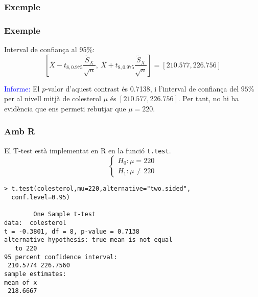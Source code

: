 \documentclass[12pt,t]{beamer}\usepackage[]{graphicx}\usepackage[]{color}
\newcommand{\red}[1]{\textcolor{red}{#1}}
\newcommand{\blue}[1]{\textcolor{blue}{#1}}
\renewcommand{\emph}[1]{{\color{red}#1}}
\renewcommand{\leq}{\leqslant}
\renewcommand{\geq}{\geqslant}
\theoremstyle{plain}
\theoremstyle{definition}
\begin{document}
\begin{frame}
\frametitle{Exemple}



\end{frame}

\begin{frame}
\frametitle{Exemple}

\emph{Interval de confiança al 95\%}:\pause
$$
\left[\overline{X}-t_{8,0.975}\frac{\widetilde{S}_X}{\sqrt{n}},\ \overline{X}+t_{8,0.975}\frac{\widetilde{S}_X}{\sqrt{n}}\right]=[210.577,226.756]
$$
\bigskip

\blue{Informe:} El $p$-valor d'aquest contrast és 0.7138, i l'interval de confiança del $95\%$ per al nivell mitjà de colesterol $\mu$ és $[210.577,226.756]$. Per tant, no hi ha evidència que ens permeti rebutjar  que $\mu=220$.



\end{frame}



\begin{frame}[fragile]
\frametitle{Amb R}

El T-test està implementat en R en la funció \texttt{t.test}. 
$$\left\{\begin{array}{l}
H_{0}:\mu=220\\
H_{1}:\mu\neq 220
\end{array}
\right.$$

{\small
\begin{verbatim}
> t.test(colesterol,mu=220,alternative="two.sided",
  conf.level=0.95)	

        One Sample t-test
data:  colesterol
t = -0.3801, df = 8, p-value = 0.7138
alternative hypothesis: true mean is not equal
   to 220
95 percent confidence interval:
 210.5774 226.7560
sample estimates:
mean of x 
 218.6667 
\end{verbatim}
}
\end{frame}
\end{document}
